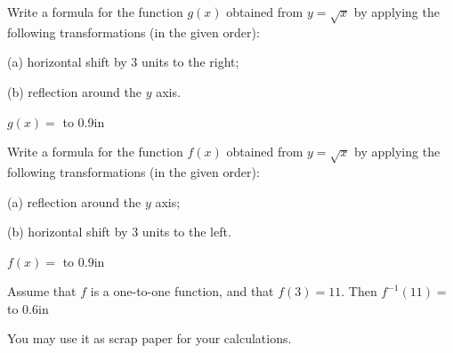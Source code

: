 \documentclass[11pt,answers]{exam}
\begin{document}
\begin{questions}
\begin{parts}
\end{parts}

\question[1] Write a formula for the function $g(x)$ obtained from $\displaystyle y=\sqrt{x}$ by applying the following transformations (in the given order): 
\begin{enumerate*}[series=MyList, before=\hspace{-0.6ex}] 
\item[(a)] horizontal shift by 3 units to the right;
\item[(b)] reflection around the $y$ axis.
\end{enumerate*}

$g(x) =$ \hbox to 0.9in{\dotfill} 

\question[1] Write a formula for the function $f(x)$ obtained from $\displaystyle y=\sqrt{x}$ by applying the following transformations (in the given order): 
\begin{enumerate*}[series=MyList, before=\hspace{-0.6ex}] 
\item[(a)] reflection around the $y$ axis; \item[(b)] horizontal shift by 3 units to the left.
\end{enumerate*}

$f(x) =$ \hbox to 0.9in{\dotfill} 



\bonusquestion[1] Assume that $f$ is a one-to-one function, and that $f(3)=11$. Then $\displaystyle f^{-1}(11)=$\hbox to 0.6in{\dotfill} 

\end{questions}
\newpage
\thispagestyle{empty}


\setlength\fboxrule{2pt}\setlength\fboxsep{2mm}
 You may use it as scrap paper for your calculations.
\end{document}
